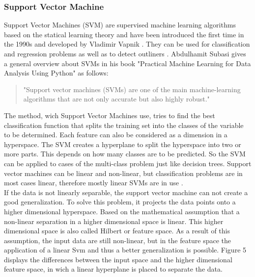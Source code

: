 \documentclass[../masterarbeit.tex]{subfiles}
\begin{document}
\subsubsection{Support Vector Machine}

Support Vector Machines (SVM) are supervised machine learning algorithms based on the statical learning theory and have been introduced the first time in the 1990s and developed by Vladimir Vapnik \textcite[]{ibm-supervised-learning:2022} \textcite[]{SUGUMARAN2007930} \textcite[]{GHOLAMI2017515}. They can be used for classification and regression problems as well as to detect outliners \textcite[]{ibm-supervised-learning:2022} \textcite[]{Scikit-learn-svm:2022}.
Abdulhamit Subasi gives a general overview about SVMs in his book "Practical Machine Learning for Data Analysis Using Python" as follows:
\begin{quote}
	"Support vector machines (SVMs) are one of the main machine-learning algorithms that are not only accurate but also highly robust." \autocite{SUBASI202091}
\end{quote} 
The method, wich Support Vector Machines use, tries to find the best classification function that splits the training set into the classes of the variable to be determined. \autocite[]{SUBASI202091}
Each feature can also be considered as a dimension in a hyperspace. The SVM creates a hyperplane to split the hyperspace into two or more parts. This depends on how many classes are to be predicted.
So the SVM can be applied to cases of the multi-class problem just like decision trees. \autocite[]{SUGUMARAN2007930}
Support vector machines can be linear and non-linear, but classification problems are in most cases linear, therefore mostly linear SVMs are in use \textcite[]{PISNER2020101}. \\
If the data is not linearly separable, the support vector machine can not create a good generalization. To solve this problem, it projects the data points onto a higher dimensional hyperspace. Based on the mathematical assumption that a non-linear separation in a higher dimensional space is linear. This higher dimensional space is also called Hilbert or feature space. As a result of this assumption, the input data are still non-linear, but in the feature space the application of a linear Svm and thus a better generalization is possible. Figure 5 displays the differences between the input space and the higher dimensional feature space, in wich a linear hyperplane is placed to separate the data. \autocite[]{GHOLAMI2017515} \\
\end{document}

